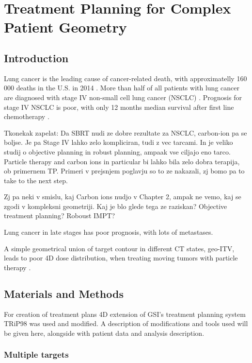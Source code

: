\documentclass[type=dr, dr=rernat, accentcolor=tud7b,colorbacktitle, bigchapter, openright, twoside, 12pt ]{tudthesis}
\begin{document}
\chapter{Treatment Planning for Complex Patient Geometry}
\label{chapter:vmm}
\minitoc

\section{Introduction}

Lung cancer is the leading cause of cancer-related death, with approximatelly 160 000 deaths in the U.S. in 2014 \cite{Siegel2014}. More than half of all patients with lung cancer are diagnosed with stage IV non-small cell lung cancer (NSCLC) \cite{Ramalingam2008, Iyengar2014}.
Prognosis for stage IV NSCLC is poor, with only 12 months median survival after first line chemotherapy \cite{Socinski2013}.

Tkonekak zapelat: Da SBRT nudi ze dobre rezultate za NSCLC, carbon-ion pa se boljse. Je pa Stage IV lahko zelo kompliciran, tudi z vec tarcami. In je veliko studij o objective planning in robust planning, ampaak vse ciljajo eno tarco.
Particle therapy and carbon ions in particular bi lahko bila zelo dobra terapija, ob primernem TP. Primeri v prejsnjem poglavju so to ze nakazali, zj bomo pa to take to the next step.

Zj pa neki v smislu, kaj Carbon ions nudjo v Chapter 2, ampak ne vemo, kaj se zgodi v kompleksni geometriji. Kaj je blo glede tega ze raziskan? Objective treatment planning? Roboust IMPT?
 

Lung cancer in late stages has poor prognosis, with lots of metastases.

A simple geometrical union of target contour in different CT states, geo-ITV, leads to poor 4D dose distribution, when treating moving tumors with particle therapy \cite{Rietzel2010}.

\section{Materials and Methods}

For creation of treatment plans 4D extension of GSI's treatment planning system TRiP98 \cite{Kraemer2000a, Richter2013} was used and modified. A description of modifications and tools used will be given here, 
alongside with patient data and analysis description.

\subsection{Multiple targets}
\end{document}

